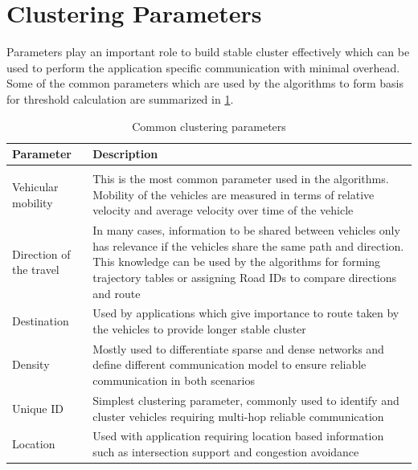 \documentclass[]{ccs-thesis}
\begin{document}
\section{Clustering Parameters}

Parameters play an important role to build stable cluster effectively which can be used to perform the application
specific communication with minimal overhead. Some of the common parameters which are used by the algorithms to
form basis for threshold calculation are summarized in \cref{tab:parameters}.

\begin{longtable}{>{\raggedright}p{3.5cm}p{7.5cm}}
    \hline
    Parameter               & Description                                                                                                          \\
    \hline
    \endhead
    \hline
    \endfoot
    \hline
    \caption{Common clustering parameters}\label{tab:parameters}                                                                                                \\
    \endlastfoot
    Vehicular mobility      & This is the most common parameter used in the algorithms. Mobility of the vehicles are measured in terms of
    relative velocity and average velocity over time of the vehicle                                                                                \\
    Direction of the travel & In many cases, information to be shared between vehicles only has relevance if the vehicles share the same path
    and direction. This knowledge can be used by the algorithms for forming trajectory tables or assigning Road IDs
    to compare directions and route                                                                                                                \\
    Destination             & Used by applications which give importance to route taken by the vehicles to provide longer stable cluster            \\
    Density                 & Mostly used to differentiate sparse and dense networks and define different communication model to ensure reliable
    communication in both scenarios                                                                                                                \\
    Unique ID               & Simplest clustering parameter, commonly used to identify and cluster vehicles requiring multi-hop reliable communication \\
    Location                & Used with application requiring location based information such as intersection support and congestion avoidance     \\
\end{longtable}
\end{document}
